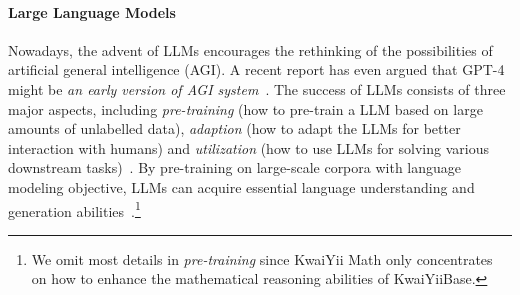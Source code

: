 \documentclass{article}
\begin{document}
\paragraph{Large Language Models}
Nowadays, the advent of LLMs encourages the rethinking of the possibilities of artificial general intelligence (AGI). A recent report has even argued that GPT-4 might be \textit{an early version of AGI system}~\cite{bubeck2023sparks}. The success of LLMs consists of three major aspects, including \textit{pre-training} (how to pre-train a LLM based on large amounts of unlabelled data), \textit{adaption} (how to adapt the LLMs for better interaction with humans) and \textit{utilization} (how to use LLMs for solving various downstream tasks)~\cite{zhao2023survey}. By pre-training on large-scale corpora with language modeling objective, LLMs can acquire essential language understanding and generation abilities~\cite{brown2020language,chowdhery2022palm}.\footnote{We omit most details in \textit{pre-training} since KwaiYii Math only concentrates on how to enhance the mathematical reasoning
abilities of KwaiYiiBase.}
\end{document}
